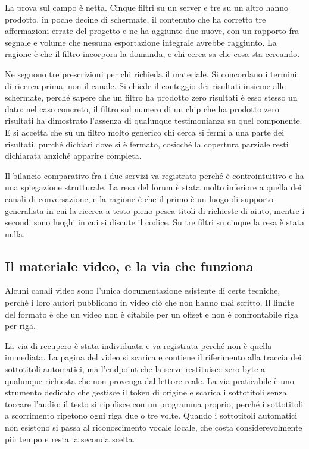 La prova sul campo è netta. Cinque filtri su un server e tre su un altro hanno prodotto, in poche decine di schermate, il contenuto che ha corretto tre affermazioni errate del progetto e ne ha aggiunte due nuove, con un rapporto fra segnale e volume che nessuna esportazione integrale avrebbe raggiunto. La ragione è che il filtro incorpora la domanda, e chi cerca sa che cosa sta cercando.

Ne seguono tre prescrizioni per chi richieda il materiale. Si concordano i termini di ricerca prima, non il canale. Si chiede il conteggio dei risultati insieme alle schermate, perché sapere che un filtro ha prodotto zero risultati è esso stesso un dato: nel caso concreto, il filtro sul numero di un chip che ha prodotto zero risultati ha dimostrato l'assenza di qualunque testimonianza su quel componente. E si accetta che su un filtro molto generico chi cerca si fermi a una parte dei risultati, purché dichiari dove si è fermato, cosicché la copertura parziale resti dichiarata anziché apparire completa.

Il bilancio comparativo fra i due servizi va registrato perché è controintuitivo e ha una spiegazione strutturale. La resa del forum è stata molto inferiore a quella dei canali di conversazione, e la ragione è che il primo è un luogo di supporto generalista in cui la ricerca a testo pieno pesca titoli di richieste di aiuto, mentre i secondi sono luoghi in cui si discute il codice. Su tre filtri su cinque la resa è stata nulla.

\subsection{Il materiale video, e la via che funziona}

Alcuni canali video sono l'unica documentazione esistente di certe tecniche, perché i loro autori pubblicano in video ciò che non hanno mai scritto. Il limite del formato è che un video non è citabile per un offset e non è confrontabile riga per riga.

La via di recupero è stata individuata e va registrata perché non è quella immediata. La pagina del video si scarica e contiene il riferimento alla traccia dei sottotitoli automatici, ma l'endpoint che la serve restituisce zero byte a qualunque richiesta che non provenga dal lettore reale. La via praticabile è uno strumento dedicato che gestisce il token di origine e scarica i sottotitoli senza toccare l'audio; il testo si ripulisce con un programma proprio, perché i sottotitoli a scorrimento ripetono ogni riga due o tre volte. Quando i sottotitoli automatici non esistono si passa al riconoscimento vocale locale, che costa considerevolmente più tempo e resta la seconda scelta.

